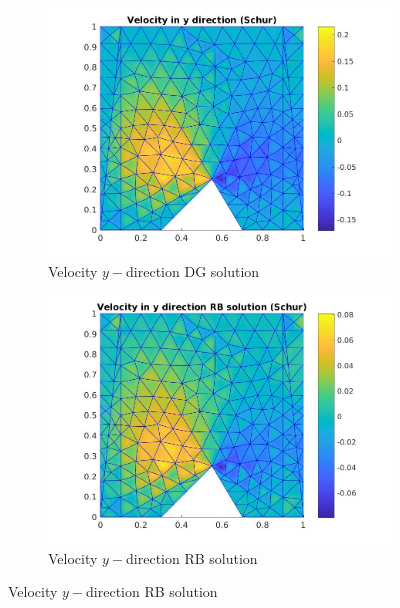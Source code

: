 \documentclass[a4paper,oneside,openright,spanish,english]{book}
\begin{document}
\begin{figure}[t!]
\medskip
\begin{subfigure}{0.48\textwidth}
\includegraphics[width=\linewidth]{offline_velocity_2_at_55_25.jpg}
\caption{Velocity $y-$direction DG solution} \label{vel_y_dg}
\end{subfigure}\hspace*{\fill}
\begin{subfigure}{0.48\textwidth}
\includegraphics[width=\linewidth]{online_velocity_2_at_55_25.jpg}
\caption{Velocity $y-$direction RB solution} \label{vel_y_rb}
\end{subfigure}


\end{figure}
\end{document}
